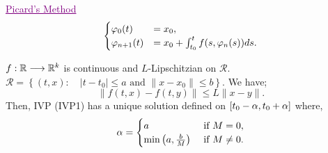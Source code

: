 \noindent
\textcolor{purple}{
\underline{
Picard's Method 
}
}\\
\[
  \begin{cases}
\varphi _{0} (t) &= x_0, \\
\varphi _{n+1}(t)  &= x_0 + \int_{t_0}^{t} f(s, \varphi_{n}(s)  ) ds.
  \end{cases}
\]
\begin{theorem}[]
$ f : \mathbb{R}  \longrightarrow \mathbb{R}^{k} $ is continuous and $L $-Lipschitzian on $\mathcal{R}$. $\mathcal{R}  = \left\{ (t,x) : \quad \left| t-t_0 \right|   \leq a \text{ and }   \| x-x_0 \| \leq b \right\}.$ We have;
\[
\| f(t, x) - f(t, y)  \| \leq  L \| x-y \|.
\]
Then, IVP (IVP1) has a unique solution defined on $\left[ t_0 - \alpha, t_0 + \alpha \right] $ where, 
\[
\alpha = \begin{cases}
  a   & \text{ if }  M = 0,\\
  \min \left( a, \frac{b}{M} \right) &\text{ if }  M \neq 0.
\end{cases}
\]
\end{theorem}
